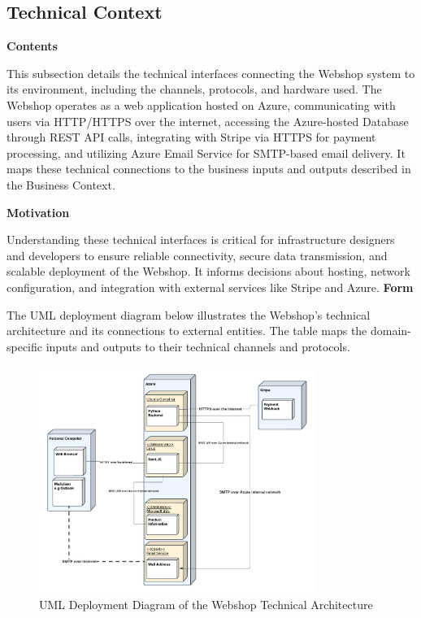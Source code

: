 \hypertarget{_technical_context}{%
\subsection{Technical Context}\label{_technical_context}}

\textbf{Contents}

This subsection details the technical interfaces connecting the Webshop system to its environment, including the channels, protocols, and hardware used. The Webshop operates as a web application hosted on Azure, communicating with users via HTTP/HTTPS over the internet, accessing the Azure-hosted Database through REST API calls, integrating with Stripe via HTTPS for payment processing, and utilizing Azure Email Service for SMTP-based email delivery. It maps these technical connections to the business inputs and outputs described in the Business Context.

\textbf{Motivation}

Understanding these technical interfaces is critical for infrastructure designers and developers to ensure reliable connectivity, secure data transmission, and scalable deployment of the Webshop. It informs decisions about hosting, network configuration, and integration with external services like Stripe and Azure.
\newpage
\textbf{Form}

The UML deployment diagram below illustrates the Webshop’s technical architecture and its connections to external entities. The table maps the domain-specific inputs and outputs to their technical channels and protocols.

\begin{figure}[h]
  \centering
  \includegraphics[width=0.8\textwidth]{images/webshop_deployment_diagram.pdf} 
  \caption{UML Deployment Diagram of the Webshop Technical Architecture}
  \label{fig:webshop-deployment}
\end{figure}

